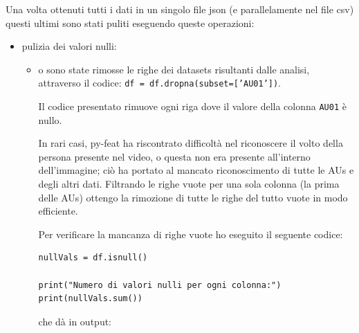 Una volta ottenuti tutti i dati in un singolo file json (e parallelamente nel file csv) questi ultimi sono stati puliti eseguendo queste operazioni:
\begin{itemize}
    \item pulizia dei valori nulli:
    \begin{itemize}
        \item o	sono state rimosse le righe dei datasets risultanti dalle analisi, attraverso il codice: \texttt{df = df.dropna(subset=['AU01'])}.
        
        Il codice presentato rimuove ogni riga dove il valore della colonna \texttt{AU01} è nullo.
        
        In rari casi, py-feat ha riscontrato difficoltà nel riconoscere il volto della persona presente nel video, o questa non era presente all’interno dell’immagine; ciò ha portato al mancato riconoscimento di tutte le AUs e degli altri dati. Filtrando le righe vuote per una sola colonna (la prima delle AUs) ottengo la rimozione di tutte le righe del tutto vuote in modo efficiente. 
        
        Per verificare la mancanza di righe vuote ho eseguito il seguente codice:
        \begin{verbatim}
nullVals = df.isnull()

print("Numero di valori nulli per ogni colonna:")
print(nullVals.sum())
        \end{verbatim}
        che dà in output:
        

\end{itemize}
\end{itemize}
